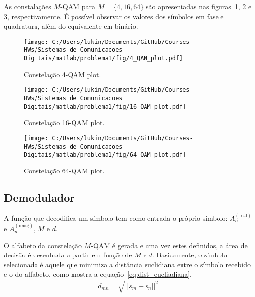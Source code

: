 As constalações $M$-QAM para $M = \{4, 16, 64\}$ são apresentadas nas figuras~\ref{fig:4_QAM_plot}, \ref{fig:16_QAM_plot} e \ref{fig:64_QAM_plot}, respectivamente. É possível observar os valores dos símbolos em fase e quadratura, além do equivalente em binário.

\clearpage
\begin{figure}[!ht]
    \centering
    \texttt{[image: C:/Users/lukin/Documents/GitHub/Courses-HWs/Sistemas de Comunicacoes Digitais/matlab/problema1/fig/4\_QAM\_plot.pdf]}
    \caption{Constelação 4-QAM plot.}
    \label{fig:4_QAM_plot}
\end{figure}

\begin{figure}[!ht]
    \centering
    \texttt{[image: C:/Users/lukin/Documents/GitHub/Courses-HWs/Sistemas de Comunicacoes Digitais/matlab/problema1/fig/16\_QAM\_plot.pdf]}
    \caption{Constelação 16-QAM plot.}
    \label{fig:16_QAM_plot}
\end{figure}

\clearpage

\begin{figure}[!ht]
    \centering
    \texttt{[image: C:/Users/lukin/Documents/GitHub/Courses-HWs/Sistemas de Comunicacoes Digitais/matlab/problema1/fig/64\_QAM\_plot.pdf]}
    \caption{Constelação 64-QAM plot.}
    \label{fig:64_QAM_plot}
\end{figure}

\subsection{Demodulador}

A função que decodifica um símbolo tem como entrada o próprio símbolo: $A_n^{(\text{real})}$ e $A_n^{(\text{imag})}$, $M$ e $d$. 

O alfabeto da constelação $M$-QAM é gerada e uma vez estes definidos, a área de decisão é desenhada a partir em função de $M$ e $d$. Basicamente, o símbolo selecionado é aquele que minimiza a distância euclidiana entre o símbolo recebido e o do alfabeto, como mostra a equação~\ref{eq:dist_eucliadiana}.
\begin{equation}
    d_{mn} = \sqrt{|| s_m - s_n||^2}
    \label{eq:dist_eucliadiana}
\end{equation}


